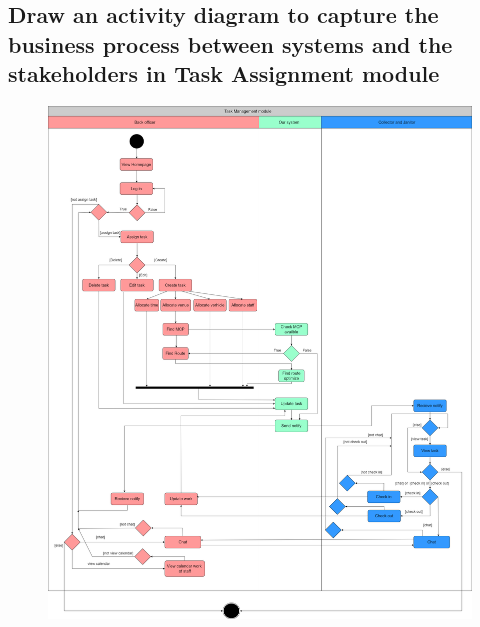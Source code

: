 \documentclass[a4paper]{article}
\begin{document}
\subsection{Draw an activity diagram to capture the business process between systems and the stakeholders in Task Assignment module}
\newpage
\begin{figure}[!h]
    \begin{center}
      \includegraphics[width=6in]{Image/activity_diagram.png}
    \end{center}
\end{figure}
\end{document}
